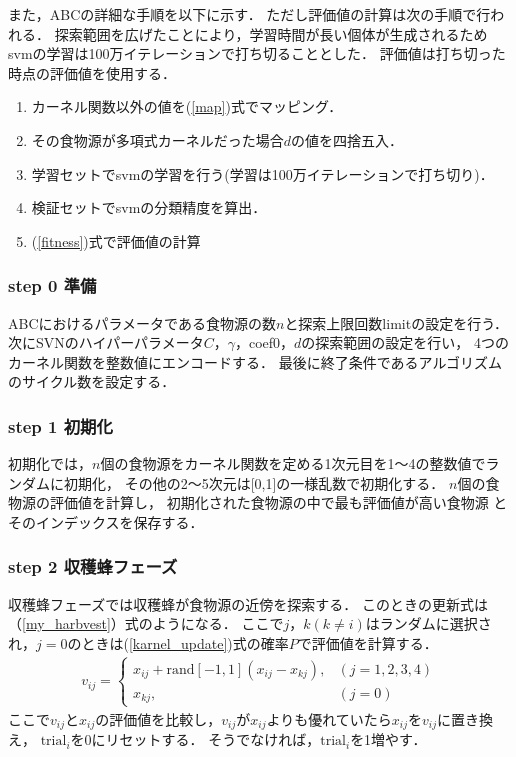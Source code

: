 また，ABCの詳細な手順を以下に示す．
ただし評価値の計算は次の手順で行われる．
探索範囲を広げたことにより，学習時間が長い個体が生成されるため
svmの学習は100万イテレーションで打ち切ることとした．
評価値は打ち切った時点の評価値を使用する．
\begin{enumerate}
    \item カーネル関数以外の値を(\ref{map})式でマッピング．
    \item その食物源が多項式カーネルだった場合$d$の値を四捨五入．
    \item 学習セットでsvmの学習を行う(学習は100万イテレーションで打ち切り)．
    \item 検証セットでsvmの分類精度を算出．
    \item (\ref{fitness})式で評価値の計算
\end{enumerate}

\subsubsection*{step 0 準備}
ABCにおけるパラメータである食物源の数$n$と探索上限回数limitの設定を行う．
次にSVNのハイパーパラメータ$C$，$\gamma$，coef0，$d$の探索範囲の設定を行い，
4つのカーネル関数を整数値にエンコードする．
最後に終了条件であるアルゴリズムのサイクル数を設定する．
\subsubsection*{step 1 初期化}
初期化では，$n$個の食物源をカーネル関数を定める1次元目を1〜4の整数値でランダムに初期化，
その他の2〜5次元は[0,1]の一様乱数で初期化する．
$n$個の食物源の評価値を計算し，
初期化された食物源の中で最も評価値が高い食物源
とそのインデックスを保存する．
\subsubsection*{step 2 収穫蜂フェーズ}
収穫蜂フェーズでは収穫蜂が食物源の近傍を探索する．
このときの更新式は（\ref{my_harbvest}）式のようになる．
ここで$j，k(k\neq i)$はランダムに選択され，$j=0$のときは(\ref{karnel_update})式の確率$P$で評価値を計算する．
\begin{align}
    \label{my_harbvest}
    v_{ij} = 
    \begin{cases}
    x_{ij} + \mathrm{rand}[-1,1](x_{ij}-x_{kj}), &  (j = 1, 2, 3, 4) \\
    x_{kj}, & (j = 0)
    \end{cases}
\end{align}
ここで$v_{ij}$と$x_{ij}$の評価値を比較し，$v_{ij}$が$x_{ij}$よりも優れていたら$x_{ij}$を$v_{ij}$に置き換え，
$\text{trial}_i$を0にリセットする．
そうでなければ，$\text{trial}_i$を1増やす．

